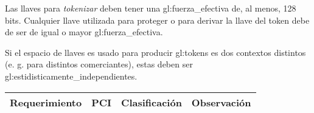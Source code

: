 {
  Las llaves para \textit{tokenizar} deben tener una
  \gls{gl:fuerza_efectiva} de, al menos, 128 bits. Cualquier llave utilizada
  para proteger o para derivar la llave del token debe de ser de igual o
  mayor \gls{gl:fuerza_efectiva}.
}

{
  Si el espacio de llaves es usado para producir \glspl{gl:token} es dos
  contextos distintos (e. g. para distintos comerciantes), estas deben ser
  \glspl{gl:estidisticamente_independiente}.
}

\begin{table}[H]
  \centering
  \begin{tabular}{| p{5.5cm} | p{2cm} | p{4cm} | p{4cm} |}

    \hline
      \textbf{Requerimiento}    &
      \textbf{PCI}              &
      \textbf{Clasificación}    &
      \textbf{Observación}     \\ [0.8ex]
    \hline


\end{tabular}
\end{table}
